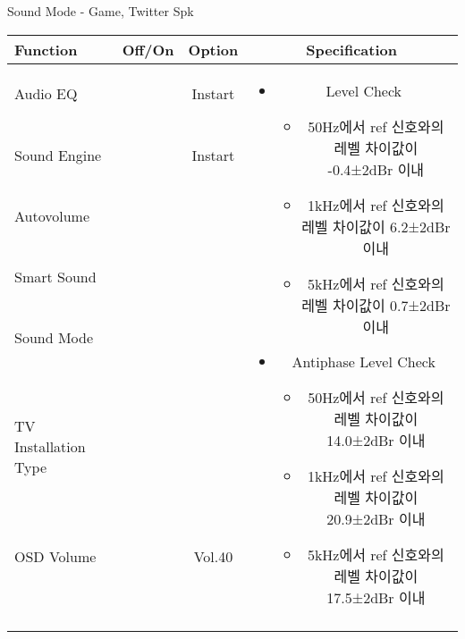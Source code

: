 \begin{frame}[t]{Sound Mode - Game, Twitter Spk}
\begin{tiny}
\begin{tabular}{@{}lccc@{}}
\toprule
Function & Off/On & Option & Specification \\
\midrule
Audio EQ & \color{black}{Off} & Instart &
\multirow{10}{60mm}{
\begin{itemize}
    \item Level Check
    \begin{itemize}
        \item 50Hz에서 ref 신호와의 레벨 차이값이 -0.4±2dBr 이내
        \item 1kHz에서 ref 신호와의 레벨 차이값이 6.2±2dBr 이내
        \item 5kHz에서 ref 신호와의 레벨 차이값이 0.7±2dBr 이내
    \end{itemize}
    \item Antiphase Level Check
    \begin{itemize}
        \item 50Hz에서 ref 신호와의 레벨 차이값이 14.0±2dBr 이내
        \item 1kHz에서 ref 신호와의 레벨 차이값이 20.9±2dBr 이내
        \item 5kHz에서 ref 신호와의 레벨 차이값이 17.5±2dBr 이내
    \end{itemize}
\end{itemize}
} \\
Sound Engine & \color{blue}{On} & Instart & \\
Autovolume & \color{black}{Off} & & \\
Smart Sound & \color{black}{Off} & & \\
Sound Mode & \color{blue}{On} & \color{blue}{Game} & \\
TV Installation Type & \color{blue}{On} & \color{black}{Standtype1} & \\
OSD Volume & \color{blue}{On} & Vol.40 & \\
& & & \\
& & & \\
& & & \\
& & & \\
\midrule
\end{tabular}
\end{tiny}

\end{frame}
